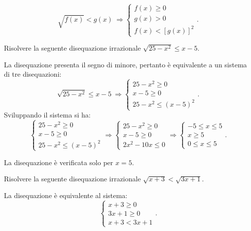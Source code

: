 \begin{equation*}
\sqrt{f(x)}<g(x) \:\Rightarrow \left\{\begin{array}{l}f(x)\ge 0\\g(x)>0\\f(x)<\left[g(x)\right]^2\end{array}\right..
\end{equation*}

\begin{exrig}
\begin{esempio}
Risolvere la seguente disequazione irrazionale $\sqrt{25-x^2}\le x-5$.

La disequazione presenta il segno di minore, pertanto è equivalente a un sistema di tre disequazioni: 
\[\sqrt{25-x^2}\le x-5 \:\Rightarrow \left\{\begin{array}{l}25-x^2\ge 0\\x-5\ge 0 \\25-x^2\le (x-5)^2\end{array}\right..\]
Sviluppando il sistema si ha: 
\[\left\{\begin{array}{l}25-x^2\ge 0\\x-5\ge 0\\25-x^2\le (x-5)^2\end{array}\right. \Rightarrow \left\{\begin{array}{l}25-x^2\ge 0\\x-5\ge 0 \\2x^2-10x\le 0\end{array}\right. \Rightarrow \left\{\begin{array}{l}-5\le x\le 5\\x\ge 5\\0\le x\le 5\end{array}\right..\]

\begin{center}
 
\end{center}

La disequazione è verificata solo per $x=5$.
\end{esempio}

\begin{esempio}
Risolvere la seguente disequazione irrazionale $\sqrt{x+3}<\sqrt{3x+1}$.

La disequazione è equivalente al sistema: 
\[\left\{\begin{array}{l}x+3\ge 0\\3x+1\ge 0\\x+3<3x+1\end{array}\right..\]


\end{esempio}
\end{exrig}
